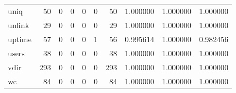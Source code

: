 \begin{longtable}{lrrrrrrrrr}
uniq      &                                        50 &                                                  0 &                                                  0 &                                                  0 &                                                  0 &                                                 50 &                                           1.000000 &                               1.000000 &                             1.000000 \\
unlink    &                                        29 &                                                  0 &                                                  0 &                                                  0 &                                                  0 &                                                 29 &                                           1.000000 &                               1.000000 &                             1.000000 \\
uptime    &                                        57 &                                                  0 &                                                  0 &                                                  0 &                                                  1 &                                                 56 &                                           0.995614 &                               1.000000 &                             0.982456 \\
users     &                                        38 &                                                  0 &                                                  0 &                                                  0 &                                                  0 &                                                 38 &                                           1.000000 &                               1.000000 &                             1.000000 \\
vdir      &                                       293 &                                                  0 &                                                  0 &                                                  0 &                                                  0 &                                                293 &                                           1.000000 &                               1.000000 &                             1.000000 \\
wc        &                                        84 &                                                  0 &                                                  0 &                                                  0 &                                                  0 &                                                 84 &                                           1.000000 &                               1.000000 &                             1.000000 \\

\end{longtable}
